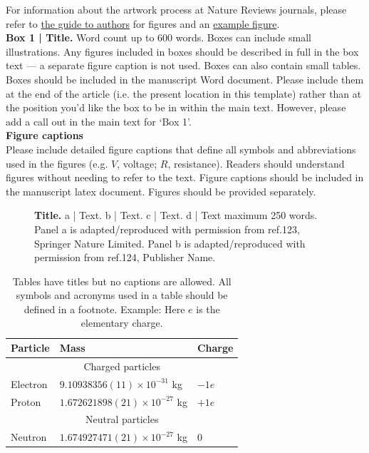 \documentclass[fleqn,10pt]{wlscirep}
\begin{document}
\noindent For information about the artwork process at Nature Reviews journals, please refer to \href{https://www.nature.com/reviews/pdf/artworkguide.pdf}{the guide to authors} for figures and an  \href{http://www.nature.com/reviews/pdf/artworkguidep2.pdf}{example figure}.\\

\noindent \textbf{Box 1 | Title.}
Word count up to 600 words. Boxes can include small illustrations. Any figures included in boxes should be described in full in the box text — a separate figure caption is not used. Boxes can also contain small tables. Boxes should be included in the manuscript Word document.  Please include them at the end of the article (i.e. the present location in this template) rather than at the position you’d like the box to be in within the main text.  However, please add a call out in the main text for ‘Box 1’.\\

\noindent \textbf{Figure captions}\\
\noindent Please include detailed figure captions that define all symbols and abbreviations used in the figures (e.g. $V$, voltage; $R$, resistance). Readers should understand figures without needing to refer to the text. Figure captions should be included in the manuscript latex document. Figures should be provided separately.\\

\begin{figure}[ht]
\centering
\caption{\textbf{Title.} a | Text. b | Text. c | Text. d | Text maximum 250 words. Panel a is adapted/reproduced with permission from ref.123, Springer Nature Limited. Panel b is adapted/reproduced with permission from ref.124, Publisher Name.}
\label{fig}
\end{figure}



\begin{table}[ht]
\centering
\begin{tabular}{|l|l|l|}
\hline
Particle & Mass & Charge \\
\hline
 \multicolumn{3}{|c|}{Charged particles}\\
\hline
Electron & $9.10938356(11)\times10^{-31}$ kg & $-1e$ \\
\hline
Proton & $1.672621898(21)\times10^{-27}$ kg & $+1e$ \\
\hline
 \multicolumn{3}{|c|}{Neutral particles}\\
\hline
Neutron & $1.674927471(21)\times10^{-27}$ kg & $0$ \\
\hline
\end{tabular}
\caption{\label{tab}Tables have titles but no captions are allowed. All symbols and acronyms used in a table should be defined in a footnote. Example: Here $e$ is the elementary charge.}
\end{table}
\end{document}

